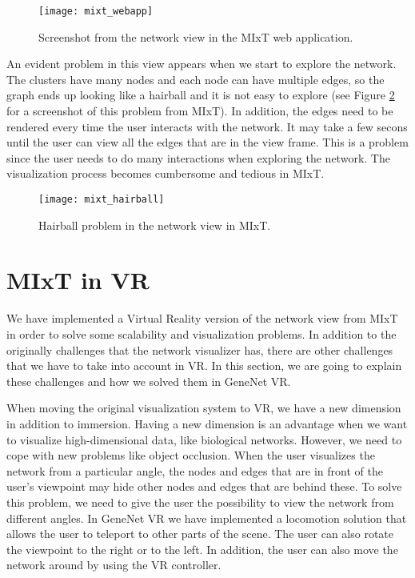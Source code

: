\begin{figure}[h!]
    \setlength{\tempheight}{15ex}
    \centering
    \texttt{[image: mixt\_webapp]}
    \caption{Screenshot from the network view in the MIxT web application.}
    \label{fig:mixt_webapp}
\end{figure}

An evident problem in this view appears when we start to explore the network. The clusters have many nodes and each node can have multiple edges, so the graph ends up looking like a hairball and it is not easy to explore (see Figure \ref{fig:mixt_hairball} for a screenshot of this problem from MIxT). In addition, the edges need to be rendered every time the user interacts with the network. It may take a few secons until the user can view all the edges that are in the view frame. This is a problem since the user needs to do many interactions when exploring the network. The visualization process becomes cumbersome and tedious in MIxT.

\begin{figure}[h!]
    \setlength{\tempheight}{15ex}
    \centering
    \texttt{[image: mixt\_hairball]}
    \caption{Hairball problem in the network view in MIxT.}
    \label{fig:mixt_hairball}
\end{figure}

\section{MIxT in VR}
We have implemented a Virtual Reality version of the network view from MIxT in order to solve some scalability and visualization problems. In addition to the originally challenges that the network visualizer has, there are other challenges that we have to take into account in VR. In this section, we are going to explain these challenges and how we solved them in GeneNet VR.

When moving the original visualization system to VR, we have a new dimension in addition to immersion. Having a new dimension is an advantage when we want to visualize high-dimensional data, like biological networks. However, we need to cope with new problems like object occlusion. When the user visualizes the network from a particular angle, the nodes and edges that are in front of the user's viewpoint may hide other nodes and edges that are behind these. To solve this problem, we need to give the user the possibility to view the network from different angles. In GeneNet VR we have implemented a locomotion solution that allows the user to teleport to other parts of the scene. The user can also rotate the viewpoint to the right or to the left. In addition, the user can also move the network around by using the VR controller.

